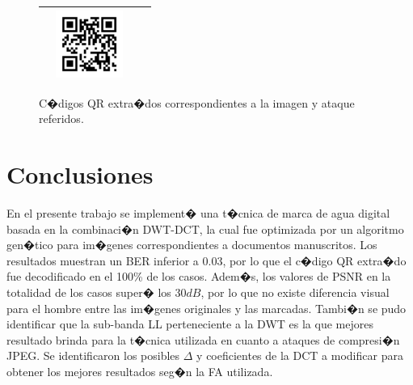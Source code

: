 \documentclass{rcci} %
\begin{document}
\begin{figure}[H]
\begin{center}
\begin{tabular}{|c|c|c|c|}
&\includegraphics[width=2.2cm]{10_jpeg_25}\\\hline
\end{tabular}
\end{center}
\caption{C�digos QR extra�dos correspondientes a la imagen y ataque referidos.}
\label{qr_extraidos}
\end{figure}

\section{Conclusiones}

En el presente trabajo se implement� una t�cnica de marca de agua digital basada en la combinaci�n DWT-DCT,
la cual fue optimizada por un algoritmo gen�tico para im�genes correspondientes a documentos manuscritos.
Los resultados muestran un BER inferior a $0.03$, por lo que el c�digo QR extra�do fue decodificado en el 100\% de
los casos. Adem�s, los valores de PSNR en la totalidad de los casos super� los $30dB$, por lo que no existe
diferencia visual para el hombre entre las im�genes originales y las marcadas.
 Tambi�n se pudo identificar que la sub-banda LL perteneciente a la DWT es la que mejores resultado brinda
 para la t�cnica utilizada en cuanto a ataques de compresi�n JPEG. Se identificaron los posibles
 $\Delta$ y coeficientes de la DCT a modificar para obtener los mejores resultados seg�n la FA utilizada.

\printbibliography
\end{document}
